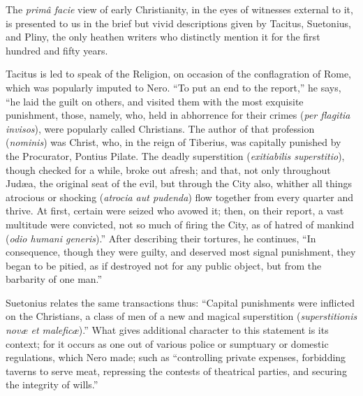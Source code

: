 
The \emph{primâ facie} view of early Christianity, in
the eyes of witnesses external to it, is presented to us
in the brief but vivid descriptions given by Tacitus,
Suetonius, and Pliny, the only heathen writers who
distinctly mention it for the first hundred and fifty
years.

Tacitus is led to speak of the Religion, on occasion
of the conflagration of Rome, which was popularly imputed
to Nero. ``To put an end to the report,'' he
says, ``he laid the guilt on others, and visited them
with the most exquisite punishment, those, namely, who,
held in abhorrence for their crimes (\emph{per flagitia
invisos}), were popularly called Christians. The
author of that profession (\emph{nominis}) was Christ,
who, in the reign of Tiberius, was capitally punished by
the Procurator, Pontius Pilate. The deadly superstition (\emph{exitiabilis
superstitio}), though checked for a while, broke out
afresh; and that, not only throughout Judæa, the original
seat of the evil, but through the City also, whither all
things atrocious or shocking (\emph{atrocia aut pudenda})
flow together from every quarter and thrive. At first,
certain were seized who avowed it; then, on their report,
a vast multitude were convicted, not so much of firing
the City, as of hatred of mankind (\emph{odio humani generis}).''
After describing their tortures, he continues, ``In
consequence, though they were guilty, and deserved most
signal punishment, they began to be pitied, as if
destroyed not for any public object, but from the
barbarity of one man.''

Suetonius relates the same transactions thus:
``Capital punishments were inflicted on the
Christians, a class of men of a new and magical
superstition (\emph{superstitionis novæ et maleficæ}).''
What gives additional character to this statement is its
context; for it occurs as one out of various police or
sumptuary or domestic regulations, which Nero made; such
as ``controlling private expenses, forbidding taverns
to serve meat, repressing the contests of theatrical
parties, and securing the integrity of wills.''

